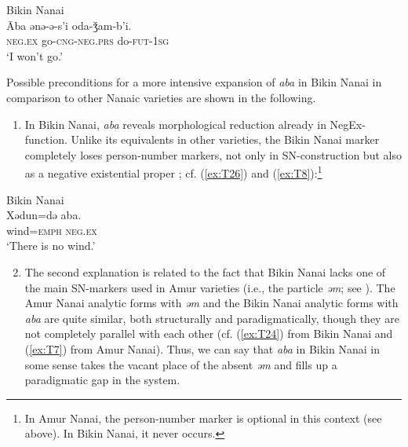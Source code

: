 \documentclass[output=paper,colorlinks,citecolor=brown]{langscibook}
\begin{document}
\ea Bikin Nanai \label{ex:T25}\\
	\gll Āba	ənə-ə-s’i			oda-ǯam-b’i.\\
	\textsc{neg.ex}	go-\textsc{cng-neg.prs}	do-\textsc{fut-1sg}\\
	\glt `I won’t go.' \citep[75]{sem1976a}
\z

Possible preconditions for a more intensive expansion of \textit{aba} in Bikin Nanai in comparison to other Nanaic varieties are shown in the following.

\begin{enumerate}
    \item In Bikin Nanai, \textit{aba} reveals morphological reduction already in NegEx-function. Unlike its equivalents in other varieties, the Bikin Nanai marker completely loses person-number markers, not only in SN-construction but also as a negative existential proper \citep[51]{sem1976a}; cf. (\ref{ex:T26}) and (\ref{ex:T8}):\footnote{In Amur Nanai, the person-number marker is optional in this context (see above). In Bikin Nanai, it never occurs.}
\end{enumerate}

\ea Bikin Nanai \label{ex:T26}\\
	\gll Xədun=də	aba.\\
	wind=\textsc{emph}	\textsc{neg.ex}\\
	\glt `There is no wind.' \citep[51]{sem1976a}
\z

\begin{enumerate}
    \setcounter{enumi}{1}
    \item The second explanation is related to the fact that Bikin Nanai lacks one of the main SN-markers used in Amur varieties (i.e., the particle \textit{əm}; see ). The Amur Nanai analytic forms with \textit{əm} and the Bikin Nanai analytic forms with \textit{aba} are quite similar, both structurally and paradigmatically, though they are not completely parallel with each other (cf. (\ref{ex:T24}) from Bikin Nanai and (\ref{ex:T7}) from Amur Nanai). Thus, we can say that \textit{aba} in Bikin Nanai in some sense takes the vacant place of the absent \textit{əm} and fills up a paradigmatic gap in the system.
\end{enumerate}
\end{document}

